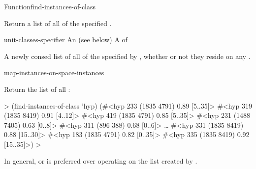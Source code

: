 \documentclass[10pt,twoside,english,pdftex]{article}
\begin{document}
\begin{functiondoc}{Function}{find-instances-of-class}%
  {
    }
%
%
%

\fnsyntax

\fnpurpose Return a list of all  of the
specified .

\fnpackage {}

\fnmodule {}

\fnargs
\begin{args}{unit-classes-specifier}
 An 
(see below)
 A  of 
\end{args}

\fnreturns
{}%
%
A newly consed list of all  of the
 specified by ,
whether or not they reside on any .

\fndsyntax
\W\supp\tabletop
\unitclassesspec
\subclassingspec

\begin{alsos}{map-instances-on-space-instances}
\end{alsos}

\fnexample
Return the list of all  :
%
\W\supp
\begin{example}
  > (find-instances-of-class 'hyp)
  (#<hyp 233 (1835 4791) 0.89 [5..35]>
   #<hyp 319 (1835 8419) 0.91 [4..12]>
   #<hyp 419 (1835 4791) 0.85 [5..35]>
   #<hyp 231 (1488 7405) 0.63 [0..8]>
   #<hyp 311 (896 388) 0.68 [0..6]> 
     \textrm{\ldots{}}
   #<hyp 331 (1835 8419) 0.88 [15..30]>
   #<hyp 183 (1835 4791) 0.82 [0..35]>
   #<hyp 335 (1835 8419) 0.92 [15..35]>)
  >
\end{example} 

\fnnote In general,  or
 is preferred over operating
on the list created by .

\end{functiondoc}
\end{document}
